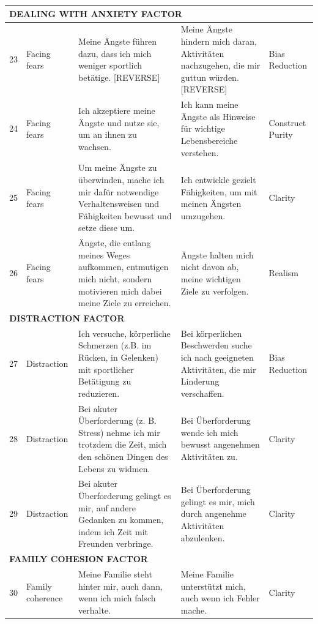 \documentclass[12pt,a4paper]{article}
\begin{document}
\begin{longtable}{p{}p{}p{}p{}p{}}
\midrule
\multicolumn{5}{l}{\textbf{DEALING WITH ANXIETY FACTOR}} \\
\midrule

23 & Facing fears & Meine Ängste führen dazu, dass ich mich weniger sportlich betätige. [REVERSE] & Meine Ängste hindern mich daran, Aktivitäten nachzugehen, die mir guttun würden. [REVERSE] & Bias Reduction \\

24 & Facing fears & Ich akzeptiere meine Ängste und nutze sie, um an ihnen zu wachsen. & Ich kann meine Ängste als Hinweise für wichtige Lebensbereiche verstehen. & Construct Purity \\

25 & Facing fears & Um meine Ängste zu überwinden, mache ich mir dafür notwendige Verhaltensweisen und Fähigkeiten bewusst und setze diese um. & Ich entwickle gezielt Fähigkeiten, um mit meinen Ängsten umzugehen. & Clarity \\

26 & Facing fears & Ängste, die entlang meines Weges aufkommen, entmutigen mich nicht, sondern motivieren mich dabei meine Ziele zu erreichen. & Ängste halten mich nicht davon ab, meine wichtigen Ziele zu verfolgen. & Realism \\

\midrule
\multicolumn{5}{l}{\textbf{DISTRACTION FACTOR}} \\
\midrule

27 & Distraction & Ich versuche, körperliche Schmerzen (z.B. im Rücken, in Gelenken) mit sportlicher Betätigung zu reduzieren. & Bei körperlichen Beschwerden suche ich nach geeigneten Aktivitäten, die mir Linderung verschaffen. & Bias Reduction \\

28 & Distraction & Bei akuter Überforderung (z. B. Stress) nehme ich mir trotzdem die Zeit, mich den schönen Dingen des Lebens zu widmen. & Bei Überforderung wende ich mich bewusst angenehmen Aktivitäten zu. & Clarity \\

29 & Distraction & Bei akuter Überforderung gelingt es mir, auf andere Gedanken zu kommen, indem ich Zeit mit Freunden verbringe. & Bei Überforderung gelingt es mir, mich durch angenehme Aktivitäten abzulenken. & Clarity \\

\midrule
\multicolumn{5}{l}{\textbf{FAMILY COHESION FACTOR}} \\
\midrule

30 & Family coherence & Meine Familie steht hinter mir, auch dann, wenn ich mich falsch verhalte. & Meine Familie unterstützt mich, auch wenn ich Fehler mache. & Clarity \\


\end{longtable}
\end{document}
